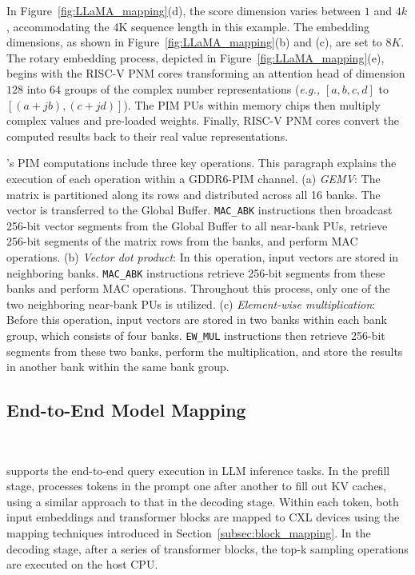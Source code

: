 In Figure~\ref{fig:LLaMA_mapping}(d), the score dimension varies between $1$ and $4k$, accommodating the 4K sequence length in this example.
The embedding dimensions, as shown in Figure~\ref{fig:LLaMA_mapping}(b) and (c), are set to $8K$.
The rotary embedding process, depicted in Figure~\ref{fig:LLaMA_mapping}(e), begins with the RISC-V PNM cores transforming an attention head of dimension $128$ into $64$ groups of the complex number representations (\textit{e.g.,} $[a, b, c, d]$ to $[(a+jb), (c+jd)]$).
The PIM PUs within memory chips then multiply complex values and pre-loaded weights.
Finally, RISC-V PNM cores convert the computed results back to their real value representations.

\att{}'s PIM computations include three key operations.
This paragraph explains the execution of each operation within a GDDR6-PIM channel.
(a) \textit{GEMV}: The matrix is partitioned along its rows and distributed across all 16 banks. The vector is transferred to the Global Buffer. \texttt{MAC\_ABK} instructions then broadcast 256-bit vector segments from the Global Buffer to all near-bank PUs, retrieve 256-bit segments of the matrix rows from the banks, and perform MAC operations.
(b) \textit{Vector dot product}: In this operation, input vectors are stored in neighboring banks. \texttt{MAC\_ABK} instructions retrieve 256-bit segments from these banks and perform MAC operations. Throughout this process, only one of the two neighboring near-bank PUs is utilized.
(c) \textit{Element-wise multiplication}: Before this operation, input vectors are stored in two banks within each bank group, which consists of four banks. \texttt{EW\_MUL} instructions then retrieve 256-bit segments from these two banks, perform the multiplication, and store the results in another bank within the same bank group.

\subsection{End-to-End Model Mapping}~\label{subsec:e2e_model_mapping}

\att{} supports the end-to-end query execution in LLM inference tasks. In the prefill stage, \att{} processes tokens in the prompt one after another to fill out KV caches, using a similar approach to that in the decoding stage. 
Within each token, both input embeddings and transformer blocks are mapped to CXL devices using the mapping techniques introduced in Section~\ref{subsec:block_mapping}. In the decoding stage, after a series of transformer blocks, the top-k sampling operations are executed on the host CPU.

